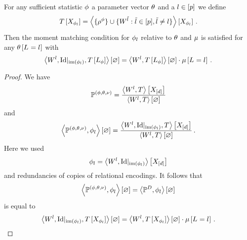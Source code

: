\begin{lemma}\label{lem:mmContractionEquation}
	For any sufficient statistic $\phi$ a parameter vector $\theta$ and a $l\in[p]$ we define
	\begin{align*}
	 	T\left[X_{\phi_{l}}\right] 
		= \left\langle \{\rho^{\phi}\}\cup\{W^{\tilde{l}} : \tilde{l} \in [p], \tilde{l}\neq l\}\right\rangle \left[ X_{\phi_{l}} \right] \, . 
	\end{align*}
	Then the moment matching condition for $\phi_{l}$ relative to $\theta$ and $\mu$ is satisfied for any $\theta\left[L_{}=l_{}\right]$ with
	\begin{align*}
		\left\langle W^{l}, {\mathrm{Id}}|_{\mathrm{im}\left(\phi_{l}\right)}, T\left[L_\phi\right]\right\rangle \left[ \varnothing \right]
		= \left\langle W^{l}, T\left[L_\phi\right]\right\rangle \left[ \varnothing \right] \cdot \mu\left[L_{}=l_{}\right] \, . 
	\end{align*}
\end{lemma}
\begin{proof}
	We have
	\begin{align*}
		\mathbb{P}^{(\phi,\theta,\nu)} = \frac{
			\left\langle W^{l}, T\right\rangle \left[ X_{[d]} \right]
		}{
			\left\langle W^{l}, T\right\rangle \left[ \varnothing \right]
		}
	\end{align*}
	and 
	\begin{align*}
		\left\langle \mathbb{P}^{(\phi,\theta,\nu)}, \phi_{l}\right\rangle \left[ \varnothing \right]
		= \frac{
			\left\langle W^{l}, {\mathrm{Id}}|_{\mathrm{im}\left(\phi_{l}\right)}, T\right\rangle \left[ X_{[d]} \right]
		}{
			\left\langle W^{l}, T\right\rangle \left[ \varnothing \right]
		} \, . 
	\end{align*}
	Here we used
		\[ \phi_{l} = \left\langle W^{l}, {\mathrm{Id}}|_{\mathrm{im}\left(\phi_{l}\right)}\right\rangle \left[ X_{[d]} \right] \]
	and redundancies of copies of relational encodings.
	It follows that 
	\begin{align*}
		\left\langle \mathbb{P}^{(\phi,\theta,\nu)},\phi_{l}\right\rangle \left[ \varnothing \right] = \left\langle \mathbb{P}^{D},\phi_{l}\right\rangle \left[ \varnothing \right]
	\end{align*}
	is equal to
	\begin{align*}
		\left\langle W^{l}, {\mathrm{Id}}|_{\mathrm{im}\left(\phi_{l}\right)}, T\left[X_{\phi_{l}}\right]\right\rangle \left[ \varnothing \right]
		= \left\langle W^{l},T\left[X_{\phi_{l}}\right]\right\rangle \left[ \varnothing \right] \cdot \mu\left[L_{}=l_{}\right] \, . 
	\end{align*}	
\end{proof}

